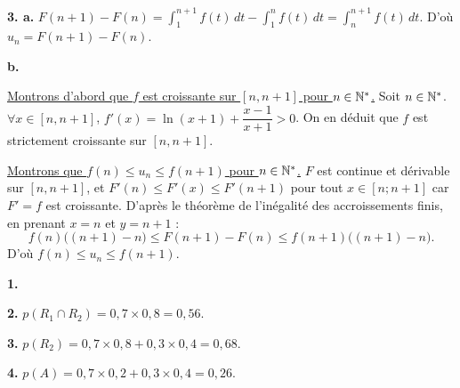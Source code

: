 \documentclass[11pt]{article}
\begin{document}
\textbf{3. a.} $F(n+1) - F(n) = \displaystyle\int_1^{n+1} f(t)\,dt - \int_1^n f(t)\,dt = \int_n^{n+1} f(t)\,dt$. D'où $u_n = F(n+1) - F(n)$.

\textbf{b.}

\underline{Montrons d'abord que $f$ est croissante sur $[n, n+1]$ pour $n \in \mathbb{N}^*$.} Soit $n \in \mathbb{N}^*$. $\forall x \in [n, n+1]$, $f'(x) = \ln(x+1) + \dfrac{x-1}{x+1} > 0$. On en déduit que $f$ est strictement croissante sur $[n, n+1]$.

\underline{Montrons que $f(n) \le u_n \le f(n+1)$ pour $n \in \mathbb{N}^*$.} $F$ est continue et dérivable sur $[n, n+1]$, et $F'(n) \le F'(x) \le F'(n+1)$ pour tout $x \in [n;n+1]$ car $F' = f$ est croissante. D'après le théorème de l'inégalité des accroissements finis, en prenant $x = n$ et $y = n+1$ :
\[ f(n)\big((n+1) - n\big) \le F(n+1) - F(n) \le f(n+1)\big((n+1) - n\big). \]
D'où $f(n) \le u_n \le f(n+1)$.


\textbf{1.} \begin{center}
\end{center}

\textbf{2.} $p(R_1 \cap R_2) = 0{,}7 \times 0{,}8 = 0{,}56$.

\textbf{3.} $p(R_2) = 0{,}7 \times 0{,}8 + 0{,}3 \times 0{,}4 = 0{,}68$.

\textbf{4.} $p(A) = 0{,}7 \times 0{,}2 + 0{,}3 \times 0{,}4 = 0{,}26$.
\end{document}
